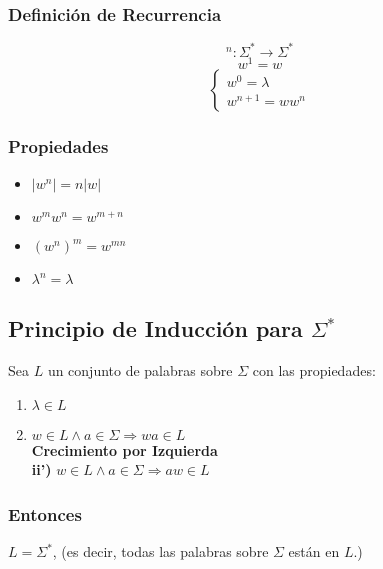 \subsubsection*{Definición de Recurrencia}
$$^n:\Sigma^*\rightarrow\Sigma^*$$
$$ w^1 = w $$
$$
\begin{cases}
w^0=\lambda \\
w^{n+1} = ww^{n}
\end{cases}
$$
\subsubsection{Propiedades}
\begin{itemize}
\item $|w^n| = n|w|$
\item $w^m w^n = w^{m+n}$
\item $(w^n)^m = w^{mn}$
\item $\lambda^n = \lambda$
\end{itemize}
\subsection{Principio de Inducción para $\Sigma^*$}
Sea $L$ un conjunto de palabras sobre $\Sigma$ con las propiedades:
\renewcommand{\labelenumi}{\theenumi}
\renewcommand{\theenumi}{\textbf{\roman{enumi}.)}}%
\begin{enumerate}
\item $\lambda \in L$
\item $w\in L \wedge a\in\Sigma \Rightarrow wa \in L$ \\${ }$\\
\textbf{Crecimiento por Izquierda} \\${ }$\\
\textbf{{\footnotesize ii')}} $w\in L \wedge a\in\Sigma \Rightarrow aw \in L$
\end{enumerate}
\subsubsection{Entonces}
$L=\Sigma^*$, (es decir, todas las palabras sobre $\Sigma$ están en $L$.)
